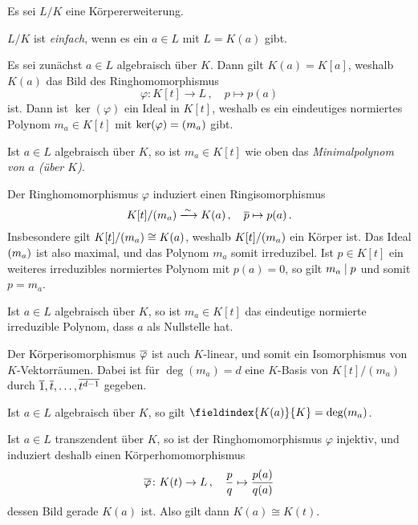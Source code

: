 Es sei $L/K$ eine Körpererweiterung.

\begin{definition}
  $L/K$ ist \emph{einfach}, wenn es ein $a \in L$ mit $L = K(a)$ gibt.
\end{definition}

Es sei zunächst $a \in L$ algebraisch über $K$.
Dann gilt $K(a) = K[a]$, weshalb $K(a)$ das Bild des Ringhomomorphismus
\[
          \varphi
  \colon  K[t]
  \to     L \,,
  \quad   p
  \mapsto p(a)
\]
ist.
Dann ist $\ker(\varphi)$ ein Ideal in $K[t]$, weshalb es ein eindeutiges normiertes Polynom $m_a \in K[t]$ mit $\ker(\varphi) = (m_a)$ gibt.

\begin{definition}
  Ist $a \in L$ algebraisch über $K$, so ist $m_a \in K[t]$ wie oben das \emph{Minimalpolynom von $a$ \textup(über $K$\textup)}.
\end{definition}

Der Ringhomomorphismus $\varphi$ induziert einen Ringisomorphismus
\[
                          K[t]/\genideal{m_a}
  \xlongrightarrow{\sim}  K(a) \,,
  \quad                   \class{p}
  \mapsto                 p(a) \,.
\]
Insbesondere gilt $K[t]/(m_a) \cong K(a)$, weshalb $K[t]/(m_a)$ ein Körper ist.
Das Ideal $(m_a)$ ist also maximal, und das Polynom $m_a$ somit irreduzibel.
Ist $p \in K[t]$ ein weiteres irreduzibles normiertes Polynom mit $p(a) = 0$, so gilt $m_a \mathrel{|} p$ und somit $p = m_a$.

\begin{corollary}
  Ist $a \in L$ algebraisch über $K$, so ist $m_a \in K[t]$ das eindeutige normierte irreduzible Polynom, dass $a$ als Nullstelle hat.
\end{corollary}

Der Körperisomorphismus $\overline{\varphi}$ ist auch $K$-linear, und somit ein Isomorphismus von $K$-Vektorräumen.
Dabei ist für $\deg(m_a) = d$ eine $K$-Basis von $K[t]/(m_a)$ durch $\overline{1}, \overline{t}, \dotsc, \overline{t^{d-1}}$ gegeben.

\begin{corollary}
  Ist $a \in L$ algebraisch über $K$, so gilt $\fieldindex{K(a)}{K} = \deg(m_a)$.
\end{corollary}

Ist $a \in L$ transzendent über $K$, so ist der Ringhomomorphismus $\varphi$ injektiv, und induziert deshalb einen Körperhomomorphismus
\[
          \overline{\varphi}
  \colon  K(t)
  \to     L \,,
  \quad   \frac{p}{q}
  \mapsto \frac{p(a)}{q(a)}
\]
dessen Bild gerade $K(a)$ ist.
Also gilt dann $K(a) \cong K(t)$.





